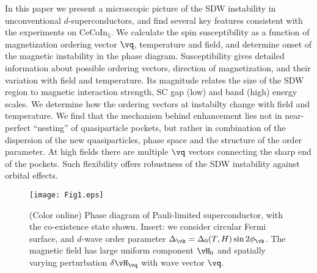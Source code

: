 \documentclass[aps,prl,twocolumn,showpacs,amsmath,amssymb]{revtex4-1}
\newcommand{\cecoin}{CeCoIn$_5$}
\begin{document}
In this paper we present a microscopic picture of the 
SDW instability in unconventional $d$-superconductors, 
and find several key features 
consistent with the experiments on \cecoin. 
We calculate the spin susceptibility as a function of magnetization ordering vector $\vq$, 
temperature and field, and determine onset of the magnetic instability in the phase diagram. 
Susceptibility gives detailed information about possible ordering vectors, direction of 
magnetization, and their variation with field and temperature. 
Its magnitude relates the size of the SDW region to magnetic interaction strength, 
SC gap (low) and band (high) energy scales. 
We determine how the ordering vectors at instabilty change 
with field and temperature. %
We find that the mechanism behind enhancement lies not in near-perfect ``nesting'' of quasiparticle pockets, 
but rather in combination of 
the dispersion of the new quasiparticles, phase space and the structure of the order parameter. 
At high fields there are multiple $\vq$ vectors connecting the sharp end of the pockets. 
Such flexibility offers robustness of 
the SDW instability against orbital effects. 

\begin{figure}[t]
\texttt{[image: Fig1.eps]}
\caption{ \label{fig:model}
(Color online)
Phase diagram of Pauli-limited superconductor, with the co-existence state shown. 
Insert: we consider circular Fermi surface, and $d$-wave order parameter 
$\Delta_\vk = \Delta_0 (T,H) \sin 2\phi_\vk $. 
The magnetic field has large uniform component $\vH_0$ and spatially varying perturbation $\delta \vH_\vq$
with wave vector $\vq$. 
}
\end{figure}
\end{document}
